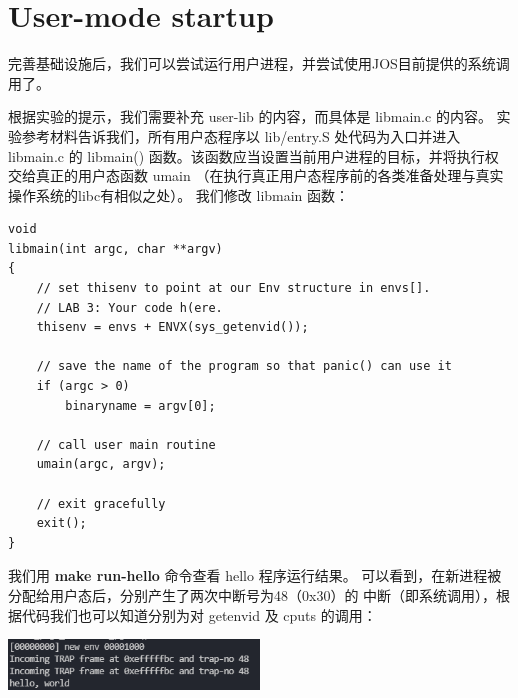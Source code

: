 \documentclass[12pt, letterpaper]{report}
\begin{document}
\section[\large User-mode startup]{User-mode startup}
完善基础设施后，我们可以尝试运行用户进程，并尝试使用JOS目前提供的系统调用了。\par 
{}
根据实验的提示，我们需要补充 user-lib 的内容，而具体是 libmain.c 的内容。
实验参考材料告诉我们，所有用户态程序以 lib/entry.S 处代码为入口并进入 libmain.c 的
libmain() 函数。该函数应当设置当前用户进程的目标，并将执行权交给真正的用户态函数 umain
（在执行真正用户态程序前的各类准备处理与真实操作系统的libc有相似之处）。
我们修改 libmain 函数：\par 
\lstset{style=CStyle}
\setmainfont{Consolas}
\begin{lstlisting}
void
libmain(int argc, char **argv)
{
    // set thisenv to point at our Env structure in envs[].
    // LAB 3: Your code h(ere.
    thisenv = envs + ENVX(sys_getenvid());

    // save the name of the program so that panic() can use it
    if (argc > 0)
        binaryname = argv[0];

    // call user main routine
    umain(argc, argv);

    // exit gracefully
    exit();
}
\end{lstlisting}
\setmainfont{Times New Roman}
我们用 \textbf{make run-hello} 命令查看 hello 程序运行结果。
可以看到，在新进程被分配给用户态后，分别产生了两次中断号为48（0x30）的
中断（即系统调用），根据代码我们也可以知道分别为对 getenvid 及 cputs 的调用：\par
\quad \par 
{
\centering
\includegraphics[width=0.5\textwidth]{runhello} \par
} 
\end{document}
